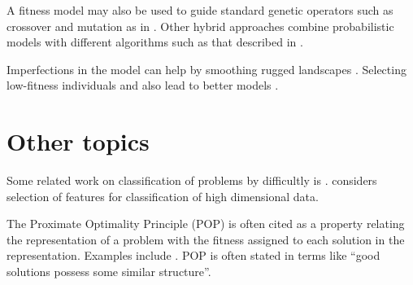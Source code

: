 \documentclass[a4paper]{article}
\begin{document}
A fitness model may also be used to guide standard genetic operators such as crossover and mutation as in \cite{Lima2005,Abboud2002,Jin:04b,Rasheed2002,Zhang2005}.
Other hybrid approaches combine probabilistic models with different algorithms such as that described in \cite{Zhang2007,Pena2004,Sastry2006}.

Imperfections in the model can help by smoothing rugged landscapes \cite{Ong2006,Liang1999,Liang2000,Shakya2006}.
Selecting low-fitness individuals and also lead to better models \cite{Branke2007,Posik2008,Posik2007,Lima_et_al:2007,Wallin2009,Wu2006}.

\section{Other topics}
Some related work on classification of problems by difficultly is \cite{Naudts2000,He2015b}. \cite{Mylavarapu2013} considers selection of features for classification of high dimensional data.

The Proximate Optimality Principle (POP) is often cited as a property relating the representation of a problem with the fitness assigned to each solution in the representation.
Examples include \cite{Li2009,Salhi2007,Zhang2005,Tuzun1999,Yaguchi2011,Sun2014,Niizuma2007,Brownlee2015}.
POP is often stated in terms like ``good solutions possess some similar structure''\cite{Niizuma2007}. 



\end{document}
